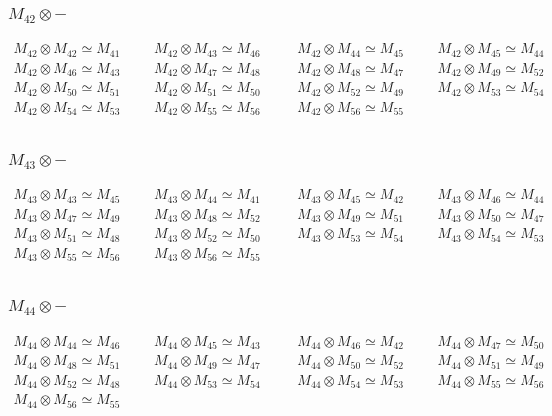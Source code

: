 \subsubsection{$M_42\otimes -$}
\begin{align*}
M_{42} \otimes M_{42} \simeq M_{41} &&& M_{42} \otimes M_{43} \simeq M_{46} &&\
& M_{42} \otimes M_{44} \simeq M_{45} &&& M_{42} \otimes M_{45} \simeq M_{44}\
\\
M_{42} \otimes M_{46} \simeq M_{43} &&& M_{42} \otimes M_{47} \simeq M_{48} &&\
& M_{42} \otimes M_{48} \simeq M_{47} &&& M_{42} \otimes M_{49} \simeq M_{52}\
\\
M_{42} \otimes M_{50} \simeq M_{51} &&& M_{42} \otimes M_{51} \simeq M_{50} &&\
& M_{42} \otimes M_{52} \simeq M_{49} &&& M_{42} \otimes M_{53} \simeq M_{54}\
\\
M_{42} \otimes M_{54} \simeq M_{53} &&& M_{42} \otimes M_{55} \simeq M_{56} &&\
& M_{42} \otimes M_{56} \simeq M_{55}\\
\end{align*}

\subsubsection{$M_43\otimes -$}
\begin{align*}
M_{43} \otimes M_{43} \simeq M_{45} &&& M_{43} \otimes M_{44} \simeq M_{41} &&\
& M_{43} \otimes M_{45} \simeq M_{42} &&& M_{43} \otimes M_{46} \simeq M_{44}\
\\
M_{43} \otimes M_{47} \simeq M_{49} &&& M_{43} \otimes M_{48} \simeq M_{52} &&\
& M_{43} \otimes M_{49} \simeq M_{51} &&& M_{43} \otimes M_{50} \simeq M_{47}\
\\
M_{43} \otimes M_{51} \simeq M_{48} &&& M_{43} \otimes M_{52} \simeq M_{50} &&\
& M_{43} \otimes M_{53} \simeq M_{54} &&& M_{43} \otimes M_{54} \simeq M_{53}\
\\
M_{43} \otimes M_{55} \simeq M_{56} &&& M_{43} \otimes M_{56} \simeq M_{55}\\
\end{align*}

\subsubsection{$M_44\otimes -$}
\begin{align*}
M_{44} \otimes M_{44} \simeq M_{46} &&& M_{44} \otimes M_{45} \simeq M_{43} &&\
& M_{44} \otimes M_{46} \simeq M_{42} &&& M_{44} \otimes M_{47} \simeq M_{50}\
\\
M_{44} \otimes M_{48} \simeq M_{51} &&& M_{44} \otimes M_{49} \simeq M_{47} &&\
& M_{44} \otimes M_{50} \simeq M_{52} &&& M_{44} \otimes M_{51} \simeq M_{49}\
\\
M_{44} \otimes M_{52} \simeq M_{48} &&& M_{44} \otimes M_{53} \simeq M_{54} &&\
& M_{44} \otimes M_{54} \simeq M_{53} &&& M_{44} \otimes M_{55} \simeq M_{56}\
\\
M_{44} \otimes M_{56} \simeq M_{55}\\
\end{align*}

